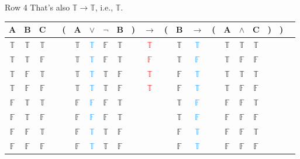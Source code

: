 \documentclass[
  ignorenonframetext,
]{beamer}
\renewcommand{\,}{\text{, }}
\def\True{\mathbb{T}}
\def\False{\mathbb{F}}
\begin{document}
\begin{frame}{Row 4}
\protect\hypertarget{row-4-1}{}
That's also \(\True \rightarrow \True\), i.e., \(\True\).

\begin{center}

\begin{tabular}{@{ }c@{ }@{ }c@{ }@{ }c | c@{ }@{}c@{}@{ }c@{ }@{ }c@{ }@{ }c@{ }@{ }c@{ }@{}c@{}@{ }c@{ }@{}c@{}@{ }c@{ }@{ }c@{ }@{}c@{}@{ }c@{ }@{ }c@{ }@{ }c@{ }@{}c@{}@{}c@{}@{ }c}
A & B & C &  & ( & A & $\vee$ & $\neg$ & B & ) & $\rightarrow$ & ( & B & $\rightarrow$ & ( & A & $\wedge$ & C & ) & ) & \\
\hline 
 $\True$ & $\True$ & $\True$ &  &  & $\True$ & \textcolor{dodgerblue}{$\True$} & $\False$ & $\True$ &  &\textcolor{red}{$\True$}&  & $\True$ & \textcolor{dodgerblue}{$\True$} &  & $\True$ & $\True$ & $\True$ &  &  & \\
 $\True$ & $\True$ & $\False$ &  &  & $\True$ & \textcolor{dodgerblue}{$\True$} & $\False$ & $\True$ &  &\textcolor{red}{$\False$}&  & $\True$ & \textcolor{dodgerblue}{$\False$} &  & $\True$ & $\False$ & $\False$ &  &  & \\
 $\True$ & $\False$ & $\True$ &  &  & $\True$ & \textcolor{dodgerblue}{$\True$} & $\True$ & $\False$ &  &\textcolor{red}{$\True$}&  & $\False$ & \textcolor{dodgerblue}{$\True$} &  & $\True$ & $\True$ & $\True$ &  &  & \\
 $\True$ & $\False$ & $\False$ &  &  & $\True$ & \textcolor{dodgerblue}{$\True$} & $\True$ & $\False$ &  &\textcolor{red}{$\True$}&  & $\False$ & \textcolor{dodgerblue}{$\True$} &  & $\True$ & $\False$ & $\False$ &  &  & \\
 $\False$ & $\True$ & $\True$ &  &  & $\False$ & \textcolor{dodgerblue}{$\False$} & $\False$ & $\True$ &  &&  & $\True$ & \textcolor{dodgerblue}{$\False$} &  & $\False$ & $\False$ & $\True$ &  &  & \\
 $\False$ & $\True$ & $\False$ &  &  & $\False$ & \textcolor{dodgerblue}{$\False$} & $\False$ & $\True$ &  &&  & $\True$ & \textcolor{dodgerblue}{$\False$} &  & $\False$ & $\False$ & $\False$ &  &  & \\
 $\False$ & $\False$ & $\True$ &  &  & $\False$ & \textcolor{dodgerblue}{$\True$} & $\True$ & $\False$ &  &&  & $\False$ & \textcolor{dodgerblue}{$\True$} &  & $\False$ & $\False$ & $\True$ &  &  & \\
 $\False$ & $\False$ & $\False$ &  &  & $\False$ & \textcolor{dodgerblue}{$\True$} & $\True$ & $\False$ &  &&  & $\False$ & \textcolor{dodgerblue}{$\True$} &  & $\False$ & $\False$ & $\False$ &  &  & \\
\end{tabular}

\end{center}
\end{frame}
\end{document}
